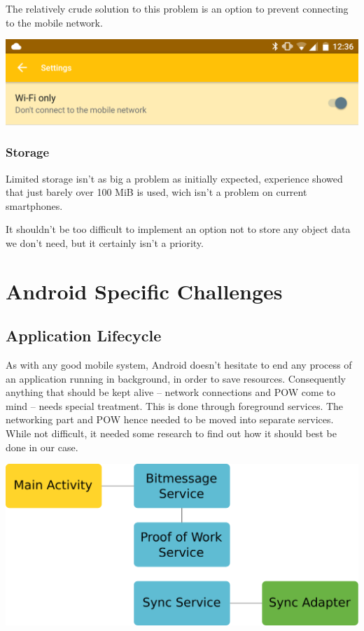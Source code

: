 \documentclass{bfh}
\begin{document}
  The relatively crude solution to this problem is an option to prevent connecting to the mobile network.

  \begin{center}
    \includegraphics[width=0.8 \textwidth]{images/screenshot_wifi_only_setting.png}
  \end{center}

  \subsubsection{Storage}
  Limited storage isn't as big a problem as initially expected, experience showed that just barely over 100 MiB is used, wich isn't a problem on current smartphones.

  It shouldn't be too difficult to implement an option not to store any object data we don't need, but it certainly isn't a priority.


  \newpage
  \section{Android Specific Challenges}
  \subsection{Application Lifecycle}
  As with any good mobile system, Android doesn't hesitate to end any process of an application running in background, in order to save resources. Consequently anything that should be kept alive -- network connections and \ac{POW} come to mind -- needs special treatment. This is done through foreground services. The networking part and \ac{POW} hence needed to be moved into separate services. While not difficult, it needed some research to find out how it should best be done in our case.

  \begin{center}
    \includegraphics[width=0.8 \textwidth]{images/services.pdf}
  \end{center}
\end{document}
